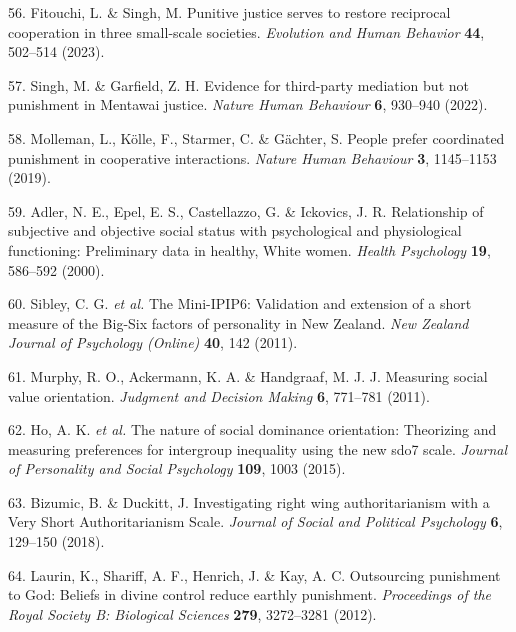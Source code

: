 \documentclass[
  english,
  man, donotrepeattitle,floatsintext]{apa6}
\newenvironment{cslreferences}%
  {}%
  {\par}
\begin{document}
\begin{cslreferences}
\leavevmode\hypertarget{ref-Fitouchi2023}{}%
56. Fitouchi, L. \& Singh, M. Punitive justice serves to restore reciprocal cooperation in three small-scale societies. \emph{Evolution and Human Behavior} \textbf{44}, 502--514 (2023).

\leavevmode\hypertarget{ref-Singh2022}{}%
57. Singh, M. \& Garfield, Z. H. Evidence for third-party mediation but not punishment in Mentawai justice. \emph{Nature Human Behaviour} \textbf{6}, 930--940 (2022).

\leavevmode\hypertarget{ref-Molleman2019}{}%
58. Molleman, L., Kölle, F., Starmer, C. \& Gächter, S. People prefer coordinated punishment in cooperative interactions. \emph{Nature Human Behaviour} \textbf{3}, 1145--1153 (2019).

\leavevmode\hypertarget{ref-Adler2000}{}%
59. Adler, N. E., Epel, E. S., Castellazzo, G. \& Ickovics, J. R. Relationship of subjective and objective social status with psychological and physiological functioning: Preliminary data in healthy, White women. \emph{Health Psychology} \textbf{19}, 586--592 (2000).

\leavevmode\hypertarget{ref-Sibley2011}{}%
60. Sibley, C. G. \emph{et al.} The Mini-IPIP6: Validation and extension of a short measure of the Big-Six factors of personality in New Zealand. \emph{New Zealand Journal of Psychology (Online)} \textbf{40}, 142 (2011).

\leavevmode\hypertarget{ref-Murphy2011}{}%
61. Murphy, R. O., Ackermann, K. A. \& Handgraaf, M. J. J. Measuring social value orientation. \emph{Judgment and Decision Making} \textbf{6}, 771--781 (2011).

\leavevmode\hypertarget{ref-Ho2015}{}%
62. Ho, A. K. \emph{et al.} The nature of social dominance orientation: Theorizing and measuring preferences for intergroup inequality using the new sdo7 scale. \emph{Journal of Personality and Social Psychology} \textbf{109}, 1003 (2015).

\leavevmode\hypertarget{ref-Bizumic2018}{}%
63. Bizumic, B. \& Duckitt, J. Investigating right wing authoritarianism with a Very Short Authoritarianism Scale. \emph{Journal of Social and Political Psychology} \textbf{6}, 129--150 (2018).

\leavevmode\hypertarget{ref-Laurin2012}{}%
64. Laurin, K., Shariff, A. F., Henrich, J. \& Kay, A. C. Outsourcing punishment to God: Beliefs in divine control reduce earthly punishment. \emph{Proceedings of the Royal Society B: Biological Sciences} \textbf{279}, 3272--3281 (2012).


\end{cslreferences}
\end{document}
